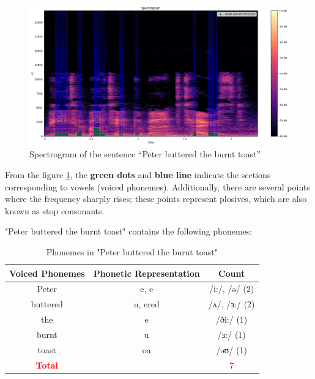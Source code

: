 \begin{figure}[H]
    \centering
    \includegraphics[width=\textwidth]{./img/Q1-1.png}
    \caption{Spectrogram of the sentence “Peter buttered the burnt toast”}
    \label{fig:Question1-2}
\end{figure}


From the figure \ref{fig:Question1-2}, the \textbf{green dots} and \textbf{blue line} indicate the sections corresponding to vowels (voiced phonemes). Additionally, there are several points where the frequency sharply rises; these points represent plosives, which are also known as stop consonants.

"Peter buttered the burnt toast" contains the following phonemes:

\begin{table}[H]
    \centering
    \begin{tabular}{|c|c|c|}
        \hline
        \textbf{Voiced Phonemes} & \textbf{Phonetic Representation} & \textbf{Count} \\ \hline
        Peter  & e, e & /i:/, /ə/ (2) \\ \hline
        buttered & u, ered & /ʌ/, /ɜ:/ (2) \\ \hline
        the & e & /ði:/ (1) \\ \hline
        burnt & u & /ɜ:/ (1) \\ \hline
        toast & oa & /əʊ/ (1) \\ \hline
        \textcolor{red}{\textbf{Total}} & & \textcolor{red}{7} \\ \hline
    \end{tabular}
    \caption{Phonemes in "Peter buttered the burnt toast"}
\end{table}

